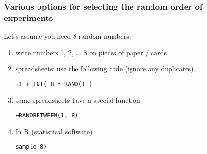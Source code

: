 \documentclass[handout,11pt,aspectratio=169,mathserif]{beamer}
\begin{document}
\begin{frame}\frametitle{Various options for selecting the random order of experiments}
	Let's assume you need 8 random numbers:
	\begin{enumerate}
		\item	write numbers 1, 2, ... 8 on pieces of paper / cards
		\item	spreadsheets: use the following code (ignore any duplicates)
			\begin{varblock}[5cm]{}
				\texttt{=1 + INT( 8 * RAND() )}
			\end{varblock}

		\item	some spreadsheets have a special function
			\begin{varblock}[5cm]{}
				\texttt{=RANDBETWEEN(1, 8)}
				\begin{center}
				\end{center}
			\end{varblock}

		\item	In R (statistical software)
			\begin{varblock}[5cm]{}
				\texttt{sample(8)}
			\end{varblock}
	\end{enumerate}
\end{frame}

{
\begin{frame}\frametitle{}
\end{frame}}

{
\begin{frame}\frametitle{}
\end{frame}}

{
\begin{frame}\frametitle{}
\end{frame}}
\end{document}
